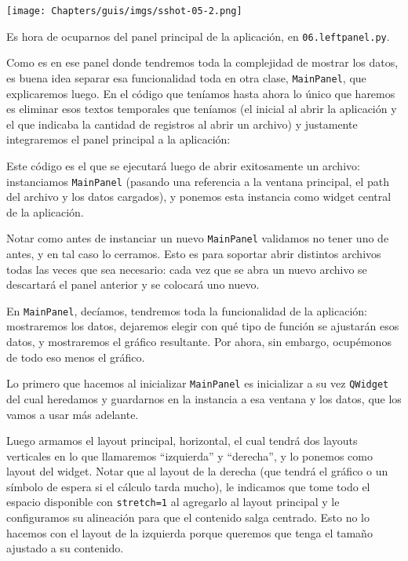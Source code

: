 \begin{center}
    \texttt{[image: Chapters/guis/imgs/sshot-05-2.png]}
\end{center}

Es hora de ocuparnos del panel principal de la aplicación, en \texttt{06.leftpanel.py}.

Como es en ese panel donde tendremos toda la complejidad de mostrar los datos, es buena idea separar esa funcionalidad toda en otra clase, \texttt{MainPanel}, que explicaremos luego. En el código que teníamos hasta ahora lo único que haremos es eliminar esos textos temporales que teníamos (el inicial al abrir la aplicación y el que indicaba la cantidad de registros al abrir un archivo) y justamente integraremos el panel principal a la aplicación:


Este código es el que se ejecutará luego de abrir exitosamente un archivo: instanciamos \texttt{MainPanel} (pasando una referencia a la ventana principal, el path del archivo y los datos cargados), y ponemos esta instancia como widget central de la aplicación.

Notar como antes de instanciar un nuevo \texttt{MainPanel} validamos no tener uno de antes, y en tal caso lo cerramos. Esto es para soportar abrir distintos archivos todas las veces que sea necesario: cada vez que se abra un nuevo archivo se descartará el panel anterior y se colocará uno nuevo.

En \texttt{MainPanel}, decíamos, tendremos toda la funcionalidad de la aplicación: mostraremos los datos, dejaremos elegir con qué tipo de función se ajustarán esos datos, y mostraremos el gráfico resultante. Por ahora, sin embargo, ocupémonos de todo eso menos el gráfico.


Lo primero que hacemos al inicializar \texttt{MainPanel} es inicializar a su vez \texttt{QWidget} del cual heredamos y guardarnos en la instancia a esa ventana y los datos, que los vamos a usar más adelante.

Luego armamos el layout principal, horizontal, el cual tendrá dos layouts verticales en lo que llamaremos ``izquierda'' y ``derecha'', y lo ponemos como layout del widget. Notar que al layout de la derecha (que tendrá el gráfico o un símbolo de espera si el cálculo tarda mucho), le indicamos que tome todo el espacio disponible con \texttt{stretch=1} al agregarlo al layout principal y le configuramos su alineación para que el contenido salga centrado. Esto no lo hacemos con el layout de la izquierda porque queremos que tenga el tamaño ajustado a su contenido.

